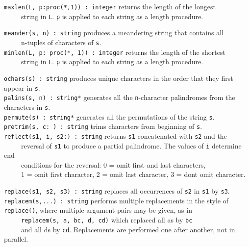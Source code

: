 \texttt{maxlen(L, p:proc({\textquotedbl}*{\textquotedbl},1)) : integer}
returns the length of the longest\\
 \ \ \ \ \ string in \texttt{L}. \texttt{p} is applied to each string as
a {\textquotedbl}length{\textquotedbl} procedure.

\texttt{meander(s, n) : string} produces a
{\textquotedbl}meandering{\textquotedbl} string that contains
all\\
 \ \ \ \ \ n-tuples of characters of \texttt{s}.\\
\texttt{minlen(L, p: proc({\textquotedbl}*{\textquotedbl}, 1)) :
integer} returns the length of the shortest\\
 \ \ \ \ \ string in \texttt{L}. \texttt{p} is applied to each string as
a {\textquotedbl}length{\textquotedbl} procedure.

\texttt{ochars(s) : string} produces unique characters in the order that
they first appear in \texttt{s}.\\
\texttt{palins(s, n) : string*} generates all the \texttt{n}{}-character
palindromes from the characters in
\texttt{s}.\\
\texttt{permute(s) : string*} generates all the permutations of the
string \texttt{s}.\\
\texttt{pretrim(s, c:{\textquotesingle} {\textquotesingle}) : string}
trims characters from beginning of \texttt{s}.\\
\texttt{reflect(s1, i, s2:{\textquotedbl}{\textquotedbl}) : string}
returns \texttt{s1} concatenated with \texttt{s2} and the\\
 \ \ \ \ \ reversal of \texttt{s1} to produce a partial palindrome. The
values of \texttt{i} determine {\textquotedbl}end\\
 \ \ \ \ \ conditions{\textquotedbl} for the reversal: 0 = omit first
and last characters,\\
 \ \ \ \ \ 1 = omit first character, 2 = omit last character, 3 =
don{\textquotesingle}t omit character.

\texttt{replace(s1, s2, s3) : string} replaces all occurrences of
\texttt{s2} in \texttt{s1} by \texttt{s3}.\\
\texttt{replacem(s,...) : string} performs multiple replacements in the style of \texttt{replace()}, where multiple
argument pairs may be given, as in\\
 \ \ \ \ \ \texttt{replacem(s, {\textquotedbl}a{\textquotedbl},
{\textquotedbl}bc{\textquotedbl}, {\textquotedbl}d{\textquotedbl},
{\textquotedbl}cd{\textquotedbl})} which replaced all
a{\textquotesingle}s by
\texttt{{\textquotedbl}bc{\textquotedbl}\\
} \ \ \ \ \ and all d{\textquotesingle}s by
\texttt{{\textquotedbl}cd{\textquotedbl}}. Replacements are performed
one after another, not in parallel.


